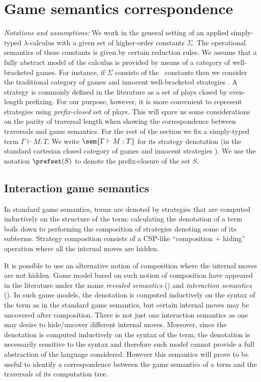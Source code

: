 




\section{Game semantics correspondence}
\label{sec:gamesemcorresp}

{\it Notations and assumptions:}
We work in the general setting of an applied
simply-typed $\lambda$-calculus with a given set of higher-order
constants $\Sigma$. The operational semantics of these constants is
given by certain reduction rules. We assume that a fully abstract
model of the calculus is provided by means of a category of
well-bracketed games. For instance, if $\Sigma$ consists
of the \pcf\ constants then we consider the traditional
category of games and innocent well-bracketed strategies
\cite{hylandong_pcf,abramsky94full}.
A strategy is commonly defined in the literature as a set of plays closed by
even-length prefixing. For our purpose, however, it is more convenient to represent strategies using \emph{prefix-closed} set of plays. This will spare us some considerations on the parity of traversal length when showing the correspondence between traversals and game semantics.
 For the rest of the section we fix a simply-typed term $\Gamma \vdash M :T$. We write $\sem{\Gamma \vdash M : T}$ for its strategy denotation (in the standard cartesian closed category of games and innocent strategies \cite{abramsky94full, hylandong_pcf}). We use the notation $\prefset(S)$ to denote the prefix-closure of the set $S$.

\subsection{Interaction game semantics}
\label{sec:interaction_semantics}

In standard game semantics, terms are denoted by strategies that are computed
inductively on the structure of the term: calculating the denotation of a term boils down to
performing the composition of strategies denoting some of its subterms. Strategy composition consists of a
CSP-like ``composition + hiding'' operation where all the internal moves are hidden.

It is possible to use an alternative notion of composition where the internal moves are not hidden.
Game model based on such notion of composition have appeared in the literature under the name \emph{revealed
semantics} (\cite{willgreenlandthesis})  and \emph{interaction semantics} (\cite{DBLP:conf/sas/DimovskiGL05}).
In such game models, the denotation is computed inductively on the syntax of the term as in the standard game semantics, but certain internal
moves may be uncovered after composition. There is not just one interaction semantics as one may desire to hide/uncover different internal moves.
Moreover, since the denotation is computed inductively on the syntax of the term, the denotation is necessarily sensitive to the syntax and therefore such model cannot provide a full abstraction of the language considered.
However this semantics will prove to be useful to identify a correspondence between the game semantics of a term
and the traversals of its computation tree.


